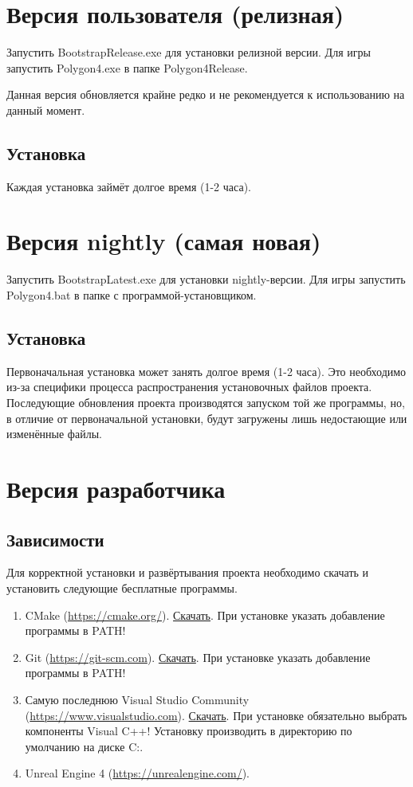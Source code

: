 \documentclass[a4paper,12pt]{report}
\begin{document}
\section{Версия пользователя (релизная)}

Запустить BootstrapRelease.exe для установки релизной версии.
Для игры запустить Polygon4.exe в папке Polygon4Release.

Данная версия обновляется крайне редко и не рекомендуется к использованию на данный момент.

\subsection{Установка}

Каждая установка займёт долгое время (1-2 часа).

\section{Версия nightly (самая новая)}

Запустить BootstrapLatest.exe для установки nightly-версии.
Для игры запустить Polygon4.bat в папке с программой-установщиком.

\subsection{Установка}

Первоначальная установка может занять долгое время (1-2 часа).
Это необходимо из-за специфики процесса распространения установочных файлов проекта.
Последующие обновления проекта производятся запуском той же программы, но, в отличие от первоначальной установки, будут загружены лишь недостающие или изменённые файлы.


\section{Версия разработчика}

\subsection{Зависимости}

Для корректной установки и развёртывания проекта необходимо скачать и установить следующие бесплатные программы.

\begin{enumerate}
\item CMake (\url{https://cmake.org/}).  \href{https://cmake.org/download}{Скачать}. При установке указать добавление программы в PATH!
\item Git (\url{https://git-scm.com}). \href{https://git-scm.com/download/win}{Скачать}. При установке указать добавление программы в PATH!
\item Самую последнюю Visual Studio Community (\url{https://www.visualstudio.com}). \href{https://visualstudio.microsoft.com/downloads/}{Скачать}. При установке обязательно выбрать компоненты Visual C++! Установку производить в директорию по умолчанию на диске C:.
\item Unreal Engine 4 (\url{https://unrealengine.com/}).
\end{enumerate}
\end{document}
